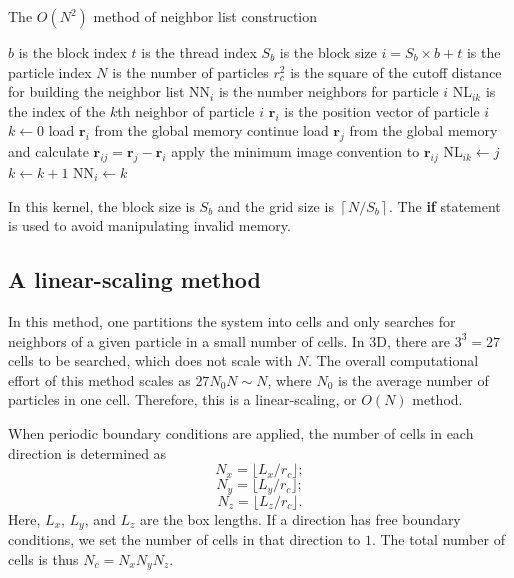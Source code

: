 \documentclass[12pt,a4paper]{report}
\newcommand{\vect}[1]{\boldsymbol{#1}}
\begin{document}
\begin{algorithm}[htb]
\caption{The $O(N^2)$ method of neighbor list construction }
\label{algorithm:neighbor_ON2}
\begin{algorithmic}[1]
\Require $b$ is the block index
\Require $t$ is the thread index
\Require $S_b$ is the block size
\Require $i=S_b\times b+t$ is the particle index
\Require $N$ is the number of particles
\Require $r_c^2$ is the square of the cutoff distance for building the neighbor list
\Require NN$_{i}$ is the number neighbors for particle $i$
\Require NL$_{ik}$ is the index of the $k$th neighbor of particle $i$
\Require $\vect{r}_{i}$ is the position vector of particle $i$
\State $k\leftarrow 0$
    \State load $\vect{r}_{i}$ from the global memory
            \State continue
        \EndIf
        \State load $\vect{r}_{j}$ from the global memory and calculate
               $\vect{r}_{ij} = \vect{r}_{j} - \vect{r}_{i}$
        \State apply the minimum image convention to $\vect{r}_{ij}$
        \If {$|\vect{r}_{ij}|^2 < r_c^2$}
            \State NL$_{ik}\leftarrow j$
            \State $k\leftarrow k+1$
        \EndIf
    \EndFor
    \State NN$_{i}\leftarrow k$
\EndIf
 \end{algorithmic}
\end{algorithm}

In this kernel, the block size is $S_b$ and the grid size is $\left \lceil {N/S_b} \right \rceil$. The \textbf{if} statement is used to avoid manipulating invalid memory.


\subsection{A linear-scaling method}


In this method, one partitions the system into cells and only searches for neighbors of a given particle in a small number of cells. In 3D, there are $3^3=27$ cells to be searched, which does not scale with $N$. The overall computational effort of this method scales as $27N_0N \sim N$, where $N_0$ is the average number of particles in one cell. Therefore, this is a linear-scaling, or $O(N)$ method.

When periodic boundary conditions are applied, the number of cells in each direction is determined as
\begin{equation}
N_{x} = \lfloor L_x / r_c \rfloor;
\end{equation}
\begin{equation}
N_{y} = \lfloor L_y / r_c \rfloor;
\end{equation}
\begin{equation}
N_{z} = \lfloor L_z / r_c \rfloor.
\end{equation}
Here, $L_x$, $L_y$, and $L_z$ are the box lengths.
If a direction has free boundary conditions, we set the number of cells in that direction to $1$. The total number of cells is thus $N_c = N_x N_y N_z$.
\end{document}
